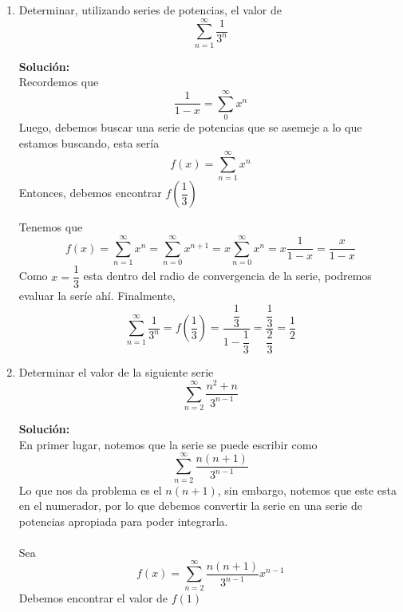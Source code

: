 \documentclass[12pt]{article}
\newenvironment{solucion}
{\begin{mdframed}[backgroundcolor=black!10]
		{\bf Solución:}\\
	}
	{
	\end{mdframed}
}
\newenvironment{preguntas}
{\begin{enumerate}\itemsep12pt
	}
	{
	\end{enumerate}
}
\newcommand{\ra}{\rightarrow}
\begin{document}
\begin{preguntas}
\begin{solucion}
\begin{enumerate}[a)]
		$$f\left(\dfrac{3}{2}\right) = \sum\limits_{n=1}^\infty 0 = 0$$
		Luego,
		$$f\left(\dfrac{3}{2}\right) = -ln(5-3) + c = 0 \ra c = ln(2)$$
		Finalmente,
		$$f(x) = -ln(5-2x) + ln(2) = ln\left(\dfrac{2}{5-2x}\right)$$
\end{enumerate}
\end{solucion}
\item Determinar, utilizando series de potencias, el valor de
	$$\sum\limits_{n=1}^\infty \frac{1}{3^n}$$
\begin{solucion}
Recordemos que $$\dfrac{1}{1-x} = \sum\limits_0^{\infty} x^n$$
		Luego, debemos buscar una serie de potencias que se asemeje a lo que estamos buscando, esta sería
		$$f(x) = \sum\limits_{n=1}^\infty x^{n}$$
		Entonces, debemos encontrar $f\left(\dfrac{1}{3}\right)$
		
		Tenemos que
		$$f(x) 
		= \sum\limits_{n=1}^\infty x^{n} 
		= \sum\limits_{n=0}^\infty x^{n+1}
		= x\sum\limits_{n=0}^\infty x^{n}
		= x \dfrac{1}{1-x}
		= \dfrac{x}{1-x}$$
		Como $x = \dfrac{1}{3}$ esta dentro del radio de convergencia de la serie, podremos evaluar la seríe ahí. Finalmente,
		$$\sum\limits_{n=1}^\infty \frac{1}{3^n} = f\left(\dfrac{1}{3}\right) = \dfrac{\dfrac{1}{3}}{1-\dfrac{1}{3}}
		= \dfrac{\dfrac{1}{3}}{\dfrac{2}{3}} = \dfrac{1}{2}$$
\end{solucion}
\item Determinar el valor de la siguiente serie
	$$ \sum\limits_{n=2}^{\infty}\dfrac{n^2+n}{3^{n-1}} $$
\begin{solucion}
En primer lugar, notemos que la serie se puede escribir como
$$ \sum\limits_{n=2}^{\infty}\dfrac{n(n+1)}{3^{n-1}} $$
Lo que nos da problema es el $n(n+1)$, sin embargo, notemos que este esta en el numerador, por lo que debemos convertir la serie en una serie de potencias apropiada para poder integrarla.	\\
\\
Sea
$$f(x) = \sum\limits_{n=2}^{\infty}\dfrac{n(n+1)}{3^{n-1}} x^{n-1} $$
Debemos encontrar el valor de $f(1)$\\


\end{solucion}
\end{preguntas}
\end{document}
